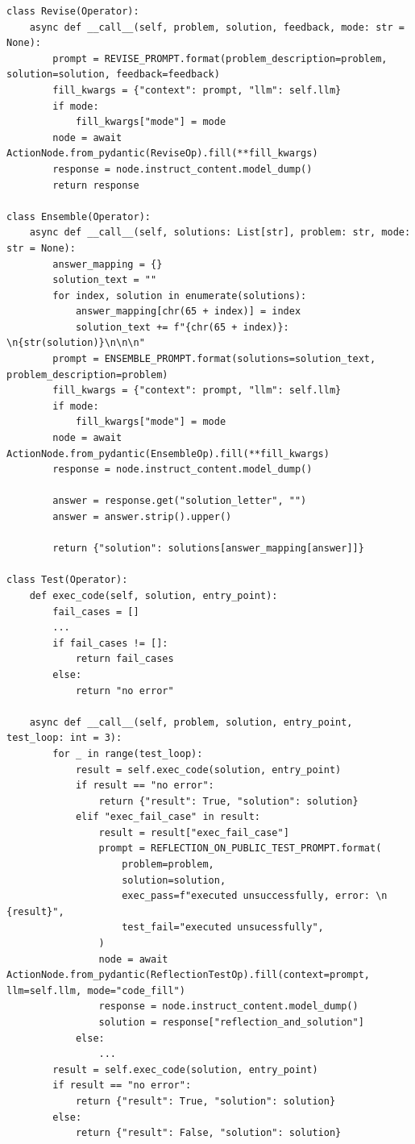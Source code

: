 \begin{tcolorbox}[title={\textbf{\small Operators}}, boxrule=1pt, arc=0mm, colback=black!5!white, colframe=black!75!white, breakable, before skip=10pt, after skip=10pt, pad at break=2mm, parbox=false]
\begin{verbatim}
class Revise(Operator):
    async def __call__(self, problem, solution, feedback, mode: str = None):
        prompt = REVISE_PROMPT.format(problem_description=problem, solution=solution, feedback=feedback)
        fill_kwargs = {"context": prompt, "llm": self.llm}
        if mode:
            fill_kwargs["mode"] = mode
        node = await ActionNode.from_pydantic(ReviseOp).fill(**fill_kwargs)
        response = node.instruct_content.model_dump()
        return response

class Ensemble(Operator):
    async def __call__(self, solutions: List[str], problem: str, mode: str = None):
        answer_mapping = {}
        solution_text = ""
        for index, solution in enumerate(solutions):
            answer_mapping[chr(65 + index)] = index
            solution_text += f"{chr(65 + index)}: \n{str(solution)}\n\n\n"
        prompt = ENSEMBLE_PROMPT.format(solutions=solution_text, problem_description=problem)
        fill_kwargs = {"context": prompt, "llm": self.llm}
        if mode:
            fill_kwargs["mode"] = mode
        node = await ActionNode.from_pydantic(EnsembleOp).fill(**fill_kwargs)
        response = node.instruct_content.model_dump()

        answer = response.get("solution_letter", "")
        answer = answer.strip().upper()

        return {"solution": solutions[answer_mapping[answer]]}

class Test(Operator):
    def exec_code(self, solution, entry_point):
        fail_cases = []
        ...
        if fail_cases != []:
            return fail_cases
        else:
            return "no error"

    async def __call__(self, problem, solution, entry_point, test_loop: int = 3):
        for _ in range(test_loop):
            result = self.exec_code(solution, entry_point)
            if result == "no error":
                return {"result": True, "solution": solution}
            elif "exec_fail_case" in result:
                result = result["exec_fail_case"]
                prompt = REFLECTION_ON_PUBLIC_TEST_PROMPT.format(
                    problem=problem,
                    solution=solution,
                    exec_pass=f"executed unsuccessfully, error: \n {result}",
                    test_fail="executed unsucessfully",
                )
                node = await ActionNode.from_pydantic(ReflectionTestOp).fill(context=prompt, llm=self.llm, mode="code_fill")
                response = node.instruct_content.model_dump()
                solution = response["reflection_and_solution"]
            else:
                ...        
        result = self.exec_code(solution, entry_point)
        if result == "no error":
            return {"result": True, "solution": solution}
        else:
            return {"result": False, "solution": solution}


\end{verbatim}
\end{tcolorbox}
